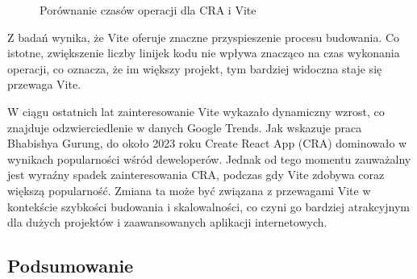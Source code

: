 \documentclass{article}
\begin{document}
\begin{figure}[H]
\centering
{}
\caption{Porównanie czasów operacji dla CRA i Vite}
\label{fig:cra_vs_vite}
\end{figure}

Z badań wynika, że Vite oferuje znaczne przyspieszenie procesu budowania. Co istotne, zwiększenie liczby linijek kodu nie wpływa znacząco na czas wykonania operacji, co oznacza, że im większy projekt, tym bardziej widoczna staje się przewaga Vite.

W ciągu ostatnich lat zainteresowanie Vite wykazało dynamiczny wzrost, co znajduje odzwierciedlenie w danych Google Trends. Jak wskazuje praca Bhabishya Gurung\cite{babisha}, do około 2023 roku Create React App (CRA) dominowało w wynikach popularności wśród deweloperów. Jednak od tego momentu zauważalny jest wyraźny spadek zainteresowania CRA, podczas gdy Vite zdobywa coraz większą popularność. Zmiana ta może być związana z przewagami Vite w kontekście szybkości budowania i skalowalności, co czyni go bardziej atrakcyjnym dla dużych projektów i zaawansowanych aplikacji internetowych.

\subsection{Podsumowanie}
\end{document}
